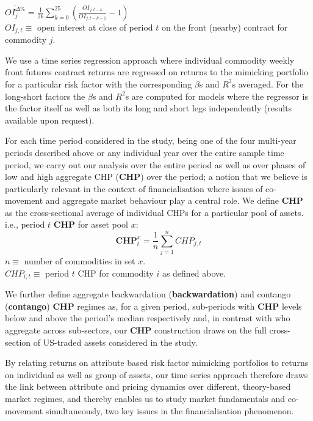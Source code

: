 \documentclass[
  authoryear,
  preprint,
  3p]{elsarticle}
\begin{document}
\(\overline{OI_{j}^{\Delta \%}}=\frac{1}{26}\sum_{k=0}^{25}(\frac{OI_{j,t-k}}{OI_{j,t-k-1}} - 1)\)\\
\(OI_{j,t}\equiv\) open interest at close of period \(t\) on the front
(nearby) contract for commodity \(j\).

\medskip

We use a time series regression approach where individual commodity
weekly front futures contract returns are regressed on returns to the
mimicking portfolio for a particular risk factor with the corresponding
\(\beta\)s and \(R^{2}\)s averaged. For the long-short factors the
\(\beta\)s and \(R^{2}\)s are computed for models where the regressor is
the factor itself as well as both its long and short legs independently
(results available upon request).

For each time period considered in the study, being one of the four
multi-year periods described above or any individual year over the
entire sample time period, we carry out our analysis over the entire
period as well as over phases of low and high aggregate CHP
(\textbf{CHP}) over the period; a notion that we believe is particularly
relevant in the context of financialisation where issues of co-movement
and aggregate market behaviour play a central role. We define
\textbf{CHP} as the cross-sectional average of individual CHPs for a
particular pool of assets. i.e., period \(t\) \textbf{CHP} for asset
pool \(x\): \[\mathbf{CHP}_{t}^{x}=\frac{1}{n}\sum_{j=1}^{n}CHP_{j,t}\]
\(n\equiv\) number of commodities in set \(x\).\\
\(CHP_{i,t}\equiv\) period \(t\) CHP for commodity \(i\) as defined
above.

\medskip

We further define aggregate backwardation (\textbf{backwardation}) and
contango (\textbf{contango}) \textbf{CHP} regimes as, for a given
period, sub-periods with \textbf{CHP} levels below and above the
period's median respectively and, in contrast with
\citep{hong_what_2012} who aggregate across sub-sectors, our
\textbf{CHP} construction draws on the full cross-section of US-traded
assets considered in the study.

\bigskip
\bigskip

By relating returns on attribute based risk factor mimicking portfolios
to returns on individual as well as group of assets, our time series
approach therefore draws the link between attribute and pricing dynamics
over different, theory-based market regimes, and thereby enables us to
study market fundamentals and co-movement simultaneously, two key issues
in the financialisation phenomenon.
\end{document}
